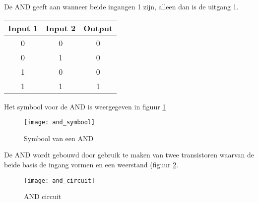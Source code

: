 De AND geeft aan wanneer beide ingangen 1 zijn, alleen dan is de uitgang 1.

\begin{tabular}{ |c|c|c| }
\hline
\rowcolor{gray!60}
	Input 1 & Input 2 & Output \\
	\hline
	0 & 0 & 0 \\
	\hline
	0 & 1 & 0 \\
	\hline
	1 & 0 & 0 \\
	\hline
	1 & 1 & 1 \\
	\hline
\end{tabular}

Het symbool voor de AND is weergegeven in figuur \ref{symbool:and}

\begin{figure}[h]
\texttt{[image: and\_symbool]}
\centering
\caption{Symbool van een AND}
\label{symbool:and}
\end{figure}

De AND wordt gebouwd door gebruik te maken van twee transistoren waarvan de beide basis de ingang vormen en een weerstand (figuur \ref{circuit:and}.

\begin{figure}[h]
\texttt{[image: and\_circuit]}
\centering
\caption{AND circuit}
\label{circuit:and}
\end{figure}

